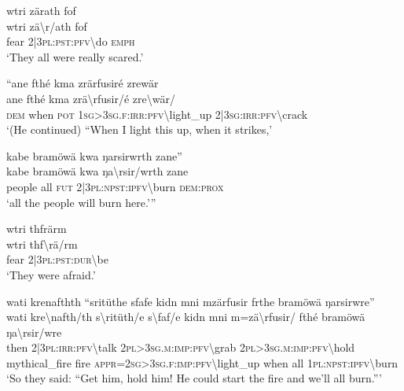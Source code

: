 \ea\label{ex:11:a2550}
wtri zärath fof\\
\gll wtri	zä{\textbackslash}r/ath	fof\\
     fear	2|3\textsc{pl}:\textsc{pst}:\textsc{pfv}{\textbackslash}do	\textsc{emph}\\
\glt `They all were really scared.'
\z

\ea\label{ex:11:a2551}
``ane fthé kma zrärfusiré zrewär\\
\gll ane	fthé	kma	zrä{\textbackslash}rfusir/é	zre{\textbackslash}wär/\\
     \textsc{dem}	when	\textsc{pot}	1\textsc{sg}>3\textsc{sg}.\textsc{f}:\textsc{irr}:\textsc{pfv}{\textbackslash}light\_up	2|3\textsc{sg}:\textsc{irr}:\textsc{pfv}{\textbackslash}crack\\
\glt `(He continued) ``When I light this up, when it strikes,'
\z

\ea\label{ex:11:a2553}
kabe bramöwä kwa ŋarsirwrth zane''\\
\gll kabe	bramöwä	kwa	ŋa{\textbackslash}rsir/wrth	zane\\
     people	all	\textsc{fut}	2|3\textsc{pl}:\textsc{npst}:\textsc{ipfv}{\textbackslash}burn	\textsc{dem}:\textsc{prox}\\
\glt `all the people will burn here.'''
\z

\ea\label{ex:11:a2554}
wtri thfrärm\\
\gll wtri	thf{\textbackslash}rä/rm\\
     fear	2|3\textsc{pl}:\textsc{pst}:\textsc{dur}{\textbackslash}be\\
\glt `They were afraid.'
\z

\ea\label{ex:11:a2555}
wati krenafthth ``sritüthe sfafe kidn mni mzärfusir frthe bramöwä ŋarsirwre''\\
\gll wati	kre{\textbackslash}nafth/th	s{\textbackslash}ritüth/e	s{\textbackslash}faf/e	kidn	mni	m=zä{\textbackslash}rfusir/	fthé	bramöwä	ŋa{\textbackslash}rsir/wre\\
     then	2|3\textsc{pl}:\textsc{irr}:\textsc{pfv}{\textbackslash}talk	2\textsc{pl}>3\textsc{sg}.\textsc{m}:\textsc{imp}:\textsc{pfv}{\textbackslash}grab	2\textsc{pl}>3\textsc{sg}.\textsc{m}:\textsc{imp}:\textsc{pfv}{\textbackslash}hold	mythical\_fire	fire	\textsc{appr}=2\textsc{sg}>3\textsc{sg}.\textsc{f}:\textsc{imp}:\textsc{pfv}{\textbackslash}light\_up	when	all	1\textsc{pl}:\textsc{npst}:\textsc{ipfv}{\textbackslash}burn\\
\glt `So they said: ``Get him, hold him! He could start the fire and we'll all burn.'''
\z

